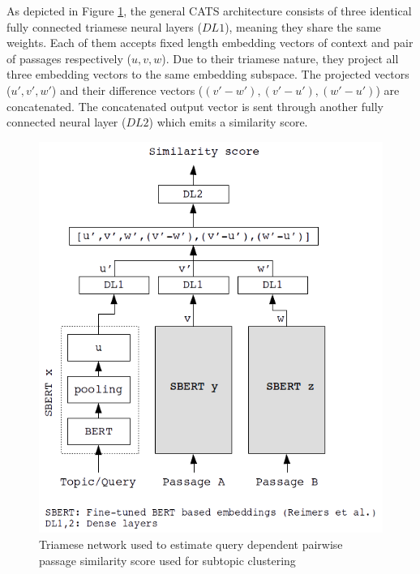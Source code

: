\documentclass[sigconf,authordraft]{acmart}
\begin{document}
As depicted in Figure \ref{fig:triam}, the general CATS architecture consists of three identical fully connected triamese neural layers ($DL1$), meaning they share the same weights. Each of them accepts fixed length embedding vectors of context and pair of passages respectively ($u,v,w$). Due to their triamese nature, they project all three embedding vectors to the same embedding subspace. The projected vectors ($u',v',w'$) and their difference vectors ($(v'-w'),(v'-u'),(w'-u')$) are concatenated. The concatenated output vector is sent through another fully connected neural layer ($DL2$) which emits a similarity score.
\begin{figure}[h]
  \centering
  \includegraphics[width=\linewidth]{graphics/triamese.png}
  \caption{Triamese network used to estimate query dependent pairwise passage similarity score used for subtopic clustering}
  \label{fig:triam}
\end{figure}
\end{document}
